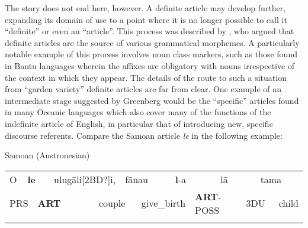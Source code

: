 \begin{styleBodytextC}
The story does not end here, however. A definite article may develop further, expanding its domain of use to a point where it is no longer possible to call it “definite” or even an “article”. This process was described by \citet{Greenberg1978}, who argued that definite articles are the source of various grammatical morphemes.  A particularly notable example of this process involves noun class markers, such  as those found in Bantu languages wherein the affixes are obligatory with nouns irrespective of the context in which they appear. The details of the route to such a situation from “garden variety” definite articles are far from clear. One example of an intermediate stage suggested by Greenberg would be the “specific” articles found in many Oceanic languages which also cover many of the functions of the indefinite article of English, in particular that of introducing new, specific discourse referents. Compare the Samoan article \textit{le} in the following example: 

\end{styleBodytextC}


\begin{listWWNumileveli}
\item {}

\begin{styleExample}
Samoan (Austronesian)

\end{styleExample}

\end{listWWNumileveli}

\begin{tabular}{llllllllllllll}
\lsptoprule
[2BD?]O & \multicolumn{2}{l}{{\bfseries le}

} & \multicolumn{2}{l}{ulug\=ali[2BD?]i,

} & \multicolumn{2}{l}{f\=anau

} & \multicolumn{2}{l}{\textbf{l}{}-a

} & \multicolumn{2}{l}{l\=a

} & \multicolumn{2}{l}{tama

} & \\
\multicolumn{2}{l}{PRS

} & \multicolumn{2}{l}{{\bfseries ART}

} & \multicolumn{2}{l}{couple

} & \multicolumn{2}{l}{give\_birth

} & \multicolumn{2}{l}{\textbf{ART}{}-POSS

} & \multicolumn{2}{l}{3DU

} & \multicolumn{2}{l}{child

}\\
\lspbottomrule
\end{tabular}

